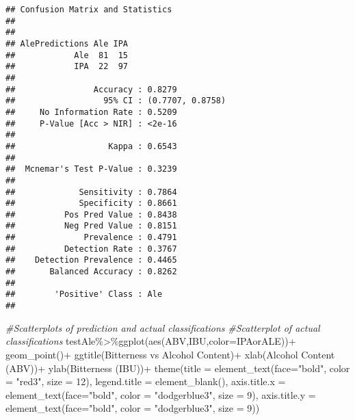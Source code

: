 \documentclass[
]{article}
\newenvironment{Shaded}{\begin{snugshade}}{\end{snugshade}}
\newcommand{\AttributeTok}[1]{\textcolor[rgb]{0.77,0.63,0.00}{#1}}
\newcommand{\CommentTok}[1]{\textcolor[rgb]{0.56,0.35,0.01}{\textit{#1}}}
\newcommand{\DecValTok}[1]{\textcolor[rgb]{0.00,0.00,0.81}{#1}}
\newcommand{\FunctionTok}[1]{\textcolor[rgb]{0.00,0.00,0.00}{#1}}
\newcommand{\NormalTok}[1]{#1}
\newcommand{\SpecialCharTok}[1]{\textcolor[rgb]{0.00,0.00,0.00}{#1}}
\newcommand{\StringTok}[1]{\textcolor[rgb]{0.31,0.60,0.02}{#1}}
\begin{document}
\begin{verbatim}
## Confusion Matrix and Statistics
## 
##               
## AlePredictions Ale IPA
##            Ale  81  15
##            IPA  22  97
##                                           
##                Accuracy : 0.8279          
##                  95% CI : (0.7707, 0.8758)
##     No Information Rate : 0.5209          
##     P-Value [Acc > NIR] : <2e-16          
##                                           
##                   Kappa : 0.6543          
##                                           
##  Mcnemar's Test P-Value : 0.3239          
##                                           
##             Sensitivity : 0.7864          
##             Specificity : 0.8661          
##          Pos Pred Value : 0.8438          
##          Neg Pred Value : 0.8151          
##              Prevalence : 0.4791          
##          Detection Rate : 0.3767          
##    Detection Prevalence : 0.4465          
##       Balanced Accuracy : 0.8262          
##                                           
##        'Positive' Class : Ale             
## 
\end{verbatim}

\begin{Shaded}
\begin{Highlighting}[]
\CommentTok{\#Scatterplots of prediction and actual classifications}
\CommentTok{\#Scatterplot of actual classifications}
\NormalTok{testAle}\SpecialCharTok{\%\textgreater{}\%}\FunctionTok{ggplot}\NormalTok{(}\FunctionTok{aes}\NormalTok{(ABV,IBU,}\AttributeTok{color=}\NormalTok{IPAorALE))}\SpecialCharTok{+}
  \FunctionTok{geom\_point}\NormalTok{()}\SpecialCharTok{+}
  \FunctionTok{ggtitle}\NormalTok{(}\StringTok{\textquotesingle{}Bitterness vs Alcohol Content\textquotesingle{}}\NormalTok{)}\SpecialCharTok{+}
  \FunctionTok{xlab}\NormalTok{(}\StringTok{\textquotesingle{}Alcohol Content (ABV)\textquotesingle{}}\NormalTok{)}\SpecialCharTok{+}
  \FunctionTok{ylab}\NormalTok{(}\StringTok{\textquotesingle{}Bitterness (IBU)\textquotesingle{}}\NormalTok{)}\SpecialCharTok{+}
  \FunctionTok{theme}\NormalTok{(}\AttributeTok{title =} \FunctionTok{element\_text}\NormalTok{(}\AttributeTok{face=}\StringTok{"bold"}\NormalTok{, }\AttributeTok{color =} \StringTok{"red3"}\NormalTok{, }\AttributeTok{size =} \DecValTok{12}\NormalTok{),}
        \AttributeTok{legend.title =} \FunctionTok{element\_blank}\NormalTok{(),}
        \AttributeTok{axis.title.x =} \FunctionTok{element\_text}\NormalTok{(}\AttributeTok{face=}\StringTok{"bold"}\NormalTok{, }\AttributeTok{color =} \StringTok{"dodgerblue3"}\NormalTok{, }\AttributeTok{size =} \DecValTok{9}\NormalTok{),}
        \AttributeTok{axis.title.y =} \FunctionTok{element\_text}\NormalTok{(}\AttributeTok{face=}\StringTok{"bold"}\NormalTok{, }\AttributeTok{color =} \StringTok{"dodgerblue3"}\NormalTok{, }\AttributeTok{size =} \DecValTok{9}\NormalTok{))}
\end{Highlighting}
\end{Shaded}
\end{document}
